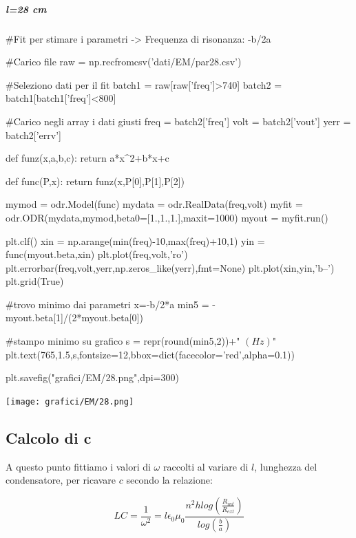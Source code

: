 \subparagraph*{l=28 cm}

\begin{sagesilent}
 #Fit per stimare i parametri -> Frequenza di risonanza: -b/2a

#Carico file
raw = np.recfromcsv('dati/EM/par28.csv')

#Seleziono dati per il fit
batch1 = raw[raw['freq']>740]
batch2 = batch1[batch1['freq']<800]

#Carico negli array i dati giusti
freq = batch2['freq']
volt = batch2['vout']
yerr = batch2['errv']


def funz(x,a,b,c):
    return a*x^2+b*x+c

def func(P,x):
    return funz(x,P[0],P[1],P[2])

mymod = odr.Model(func)
mydata = odr.RealData(freq,volt)
myfit = odr.ODR(mydata,mymod,beta0=[1.,1.,1.],maxit=1000)
myout = myfit.run()

plt.clf()
xin = np.arange(min(freq)-10,max(freq)+10,1)
yin = func(myout.beta,xin)
plt.plot(freq,volt,'ro')
plt.errorbar(freq,volt,yerr,np.zeros_like(yerr),fmt=None)
plt.plot(xin,yin,'b--')
plt.grid(True)

#trovo minimo dai parametri x=-b/2*a
min5 = -myout.beta[1]/(2*myout.beta[0]) 

#stampo minimo su grafico
s = repr(round(min5,2))+" $(Hz)$"
plt.text(765,1.5,s,fontsize=12,bbox=dict(facecolor='red',alpha=0.1))

plt.savefig("grafici/EM/28.png",dpi=300)
\end{sagesilent}

\texttt{[image: grafici/EM/28.png]}



\subsection*{Calcolo di c}

A questo punto fittiamo i valori di $\omega$ raccolti al variare di $l$, lunghezza del condensatore, per ricavare $c$ secondo la relazione:

\begin{equation}
 LC = \frac{1}{{\omega}^2} = l \epsilon_{0} \mu_{0} \frac{n^2 h log(\frac{R_{int}}{R_{ext}})}{log (\frac{b}{a})}
\end{equation}

